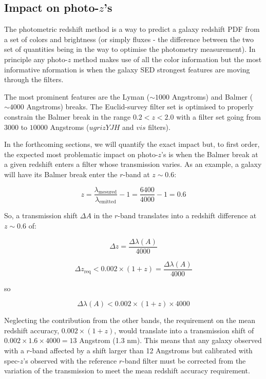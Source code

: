 \documentclass[11pt]{article}
\begin{document}
\subsection{\texorpdfstring{Impact on
photo-\(z\)'s}{Impact on photo-z's}}\label{impact-on-photo-zs}

The photometric redshift method is a way to predict a galaxy redshift
PDF from a set of colors and brightness (or simply fluxes - the
difference between the two set of quantities being in the way to
optimise the photometry measurement). In principle any photo-\(z\)
method makes use of all the color information but the most informative
nformation is when the galaxy SED strongest features are moving through
the filters.

The most prominent features are the Lyman (\(\sim1000\) Angstroms) and
Balmer (\(\sim4000\) Angstroms) breaks. The Euclid-survey filter set is
optimised to properly constrain the Balmer break in the range
\(0.2<z<2.0\) with a filter set going from \(3000\) to \(10000\)
Angstroms (\(ugrizYJH\) and \(vis\) filters).

In the forthcoming sections, we will quantify the exact impact but, to
first order, the expected most problematic impact on photo-\(z\)'s is
when the Balmer break at a given redshift enters a filter whose
transmission varies. As an example, a galaxy will have its Balmer break
enter the \(r\)-band at \(z\sim0.6\):

    \begin{equation}
z = \frac{\lambda_\mathrm{ mesured}}{\lambda_\mathrm{ emitted}} - 1 = \frac{6400}{4000}-1 = 0.6
\end{equation}

    So, a transmission shift \(\Delta A\) in the \(r\)-band translates into
a redshift difference at \(z\sim0.6\) of:

    \begin{equation}
\Delta z = \frac{\Delta \lambda (A)}{4000}
\end{equation}

\begin{equation}
\Delta z_\mathrm{req} < 0.002\times(1+z) = \frac{\Delta \lambda(A)}{4000}
\end{equation}

so

\begin{equation}
\Delta \lambda(A) < 0.002\times(1+z)\times4000
\end{equation}

    Neglecting the contribution from the other bands, the requirement on the
mean redshift accuracy, \(0.002\times(1+z)\), would translate into a
transmission shift of \(0.002\times1.6\times4000=13\) Angstrom (1.3 nm).
This means that any galaxy observed with a \(r\)-band affected by a
shift larger than 12 Angstroms but calibrated with spec-\(z\)'s observed
with the reference \(r\)-band filter must be corrected from the
variation of the transmission to meet the mean redshift accuracy
requirement.
\end{document}
